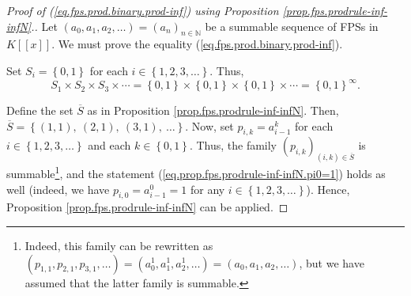 \begin{proof}
[Proof of (\ref{eq.fps.prod.binary.prod-inf}) using Proposition
\ref{prop.fps.prodrule-inf-infN}.]Let $\left(  a_{0},a_{1},a_{2}%
,\ldots\right)  =\left(  a_{n}\right)  _{n\in\mathbb{N}}$ be a summable
sequence of FPSs in $K\left[  \left[  x\right]  \right]  $. We must prove the
equality (\ref{eq.fps.prod.binary.prod-inf}).

Set $S_{i}=\left\{  0,1\right\}  $ for each $i\in\left\{  1,2,3,\ldots
\right\}  $. Thus,%
\[
S_{1}\times S_{2}\times S_{3}\times\cdots=\left\{  0,1\right\}  \times\left\{
0,1\right\}  \times\left\{  0,1\right\}  \times\cdots=\left\{  0,1\right\}
^{\infty}.
\]


Define the set $\overline{S}$ as in Proposition
\ref{prop.fps.prodrule-inf-infN}. Then, $\overline{S}=\left\{  \left(
1,1\right)  ,\ \left(  2,1\right)  ,\ \left(  3,1\right)  ,\ \ldots\right\}
$. Now, set $p_{i,k}=a_{i-1}^{k}$ for each $i\in\left\{  1,2,3,\ldots\right\}
$ and each $k\in\left\{  0,1\right\}  $. Thus, the family $\left(
p_{i,k}\right)  _{\left(  i,k\right)  \in\overline{S}}$ is
summable\footnote{Indeed, this family can be rewritten as $\left(
p_{1,1},p_{2,1},p_{3,1},\ldots\right)  =\left(  a_{0}^{1},a_{1}^{1},a_{2}%
^{1},\ldots\right)  =\left(  a_{0},a_{1},a_{2},\ldots\right)  $, but we have
assumed that the latter family is summable.}, and the statement
(\ref{eq.prop.fps.prodrule-inf-infN.pi0=1}) holds as well (indeed, we have
$p_{i,0}=a_{i-1}^{0}=1$ for any $i\in\left\{  1,2,3,\ldots\right\}  $). Hence,
Proposition \ref{prop.fps.prodrule-inf-infN} can be applied.


\end{proof}
